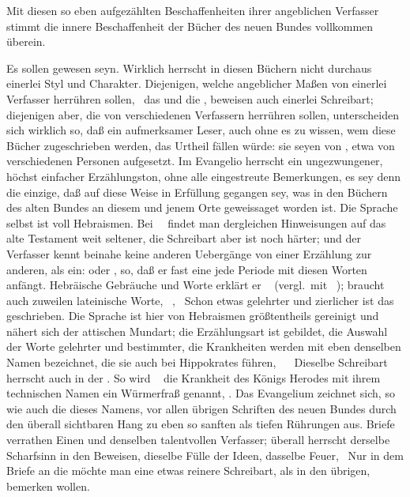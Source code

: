 Mit diesen so eben aufgezählten Beschaffenheiten ihrer angeblichen Verfasser stimmt die innere Beschaffenheit der Bücher des neuen Bundes vollkommen überein.
\begin{aufza}
\item Es sollen  gewesen seyn. Wirklich herrscht in diesen Büchern nicht durchaus einerlei Styl und Charakter. Diejenigen, welche angeblicher Maßen von einerlei Verfasser herrühren sollen, \zB\ das  und die , beweisen auch einerlei Schreibart; diejenigen aber, die von verschiedenen Verfassern herrühren sollen, unterscheiden sich wirklich so, daß ein aufmerksamer Leser, auch ohne es zu wissen, wem diese Bücher zugeschrieben werden, das Urtheil fällen würde: sie seyen von , etwa von  verschiedenen Personen aufgesetzt. Im Evangelio  herrscht ein ungezwungener, höchst einfacher Erzählungston, ohne alle eingestreute Bemerkungen, es sey denn die einzige, daß auf diese Weise in Erfüllung gegangen sey, was in den Büchern des alten Bundes an diesem und jenem Orte geweissaget worden ist. Die Sprache selbst ist voll Hebraismen. Bei ~\ findet man dergleichen Hinweisungen auf das alte Testament weit seltener, die Schreibart aber ist noch härter; und der Verfasser kennt beinahe keine anderen Uebergänge von einer Erzählung zur anderen, als ein:  oder , so, daß er fast eine jede Periode mit diesen Worten anfängt. Hebräische Gebräuche und Worte erklärt er \zB\  (vergl.\ mit \ ); braucht auch zuweilen lateinische Worte, \zB\ , \uam\ Schon etwas gelehrter und zierlicher ist das  geschrieben. Die Sprache ist hier von Hebraismen größtentheils gereinigt und nähert sich der attischen Mundart; die Erzählungsart ist gebildet, die Auswahl der Worte gelehrter und bestimmter, die Krankheiten werden mit eben denselben  Namen bezeichnet, die sie auch bei Hippokrates führen, \zB\   \ua\ Dieselbe Schreibart herrscht auch in der . So wird \zB\  die Krankheit des Königs Herodes mit ihrem technischen Namen ein Würmerfraß genannt, . Das Evangelium  zeichnet sich, so wie auch die  dieses Namens, vor allen übrigen Schriften des neuen Bundes durch den überall sichtbaren Hang zu eben so sanften als tiefen Rührungen aus.  Briefe verrathen Einen und denselben talentvollen Verfasser; überall herrscht derselbe Scharfsinn in den Beweisen, dieselbe Fülle der Ideen, dasselbe Feuer, \usw\ Nur in dem Briefe an die  möchte man eine etwas reinere Schreibart, als in den übrigen, bemerken wollen.

\end{aufza}
